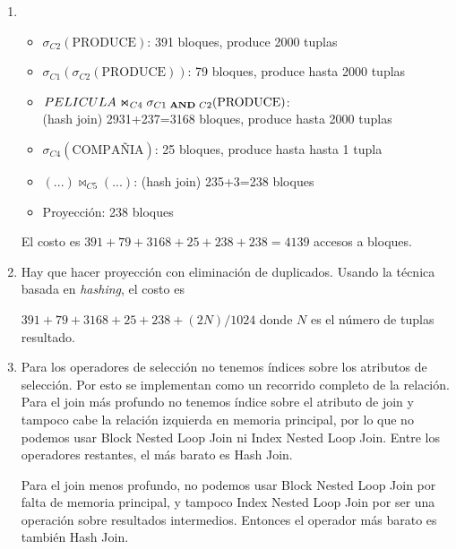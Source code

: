 \documentclass[10pt]{article}
\begin{document}
\begin{enumerate}
\begin{enumerate}
\end{enumerate}

 \item

\begin{itemize}

\item $\sigma_{C2}(\text{PRODUCE})$: 391 bloques, produce 2000 tuplas

\item $\sigma_{C1}(\sigma_{C2}(\text{PRODUCE}))$: 79 bloques, produce hasta 2000 tuplas

\item $PELICULA \Join_{C4} \sigma_{C1 \text{ {\bf AND} } C2}(\text{PRODUCE})$: \\
      (hash join) 2931+237=3168 bloques, produce hasta 2000 tuplas

\item $\sigma_{C4}(\text{COMPAÑIA})$: 25 bloques, produce hasta hasta 1 tupla

\item $(...) \Join_{C5} (...)$: (hash join) 235+3=238 bloques

\item Proyección: 238 bloques

\end{itemize}

El costo es $391+79+3168+25+238+238=4139$ accesos a bloques.

 \item

Hay que hacer proyección con eliminación de duplicados. Usando la técnica basada
en \emph{hashing}, el costo es 

$391+79+3168+25+238+(2N)/1024$ donde $N$ es el número de tuplas resultado.

 \item

Para los operadores de selección no tenemos índices sobre los atributos de selección. Por esto
se implementan como un recorrido completo de la relación. Para el join más profundo no tenemos índice
sobre el atributo de join y tampoco cabe la relación izquierda en memoria principal, por lo que no podemos
usar Block Nested Loop Join ni Index Nested Loop Join. Entre los operadores restantes, el más barato
es Hash Join.

Para el join menos profundo, no podemos usar Block Nested Loop Join por falta de memoria principal, y tampoco
Index Nested Loop Join por ser una operación sobre resultados intermedios. Entonces el operador más barato
es también Hash Join.


\end{enumerate}
\end{document}
